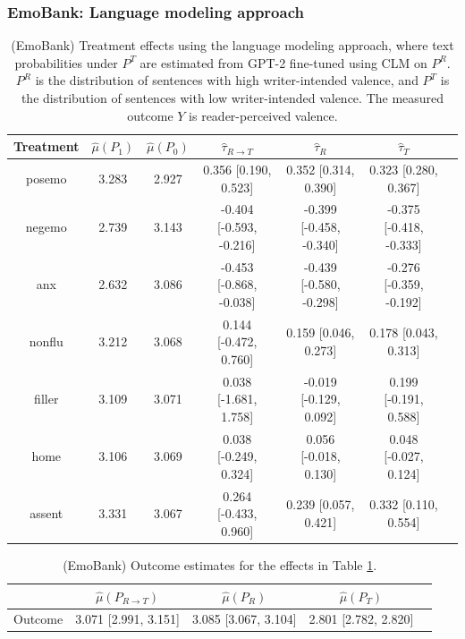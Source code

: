 \documentclass{article}
\begin{document}
\newpage
\subsubsection{EmoBank: Language modeling approach}

\begin{table}[!ht]
\centering
\begin{tabular}{c|cccccc}
\toprule
    Treatment   &   $\hat{\mu}(P_1)$ &   $\hat{\mu}(P_0)$ & $\hat{\tau}_{R \rightarrow T}$   & $\hat{\tau}_R$          & $\hat{\tau}_T$          \\
\midrule
    posemo      &              3.283 &              2.927 & 0.356 [0.190, 0.523]             & 0.352 [0.314, 0.390]    & 0.323 [0.280, 0.367]    \\
    negemo      &              2.739 &              3.143 & -0.404 [-0.593, -0.216]          & -0.399 [-0.458, -0.340] & -0.375 [-0.418, -0.333] \\
    anx         &              2.632 &              3.086 & -0.453 [-0.868, -0.038]          & -0.439 [-0.580, -0.298] & -0.276 [-0.359, -0.192] \\
    nonflu      &              3.212 &              3.068 & 0.144 [-0.472, 0.760]            & 0.159 [0.046, 0.273]    & 0.178 [0.043, 0.313]    \\
    filler      &              3.109 &              3.071 & 0.038 [-1.681, 1.758]            & -0.019 [-0.129, 0.092]  & 0.199 [-0.191, 0.588]   \\
    home        &              3.106 &              3.069 & 0.038 [-0.249, 0.324]            & 0.056 [-0.018, 0.130]   & 0.048 [-0.027, 0.124]   \\
    assent      &              3.331 &              3.067 & 0.264 [-0.433, 0.960]            & 0.239 [0.057, 0.421]    & 0.332 [0.110, 0.554]    \\
\bottomrule
\end{tabular}
\caption{(EmoBank) Treatment effects using the language modeling approach, where text probabilities under $P^T$ are estimated from GPT-2 fine-tuned using CLM on $P^R$. $P^R$ is the distribution of sentences with high writer-intended valence, and $P^T$ is the distribution of sentences with low writer-intended valence. The measured outcome $Y$ is reader-perceived valence.}
\label{tab:results_clm_gpt2_finetuned_emobank_pr}
\end{table}

\begin{table}[!ht]
\centering
\begin{tabular}{c|cccc}
\toprule
    & $\hat{\mu}(P_{R \rightarrow T})$   & $\hat{\mu}(P_R)$     & $\hat{\mu}(P_T)$     \\
\midrule
    Outcome & 3.071 [2.991, 3.151]               & 3.085 [3.067, 3.104] & 2.801 [2.782, 2.820] \\
\bottomrule
\end{tabular}
\caption{(EmoBank) Outcome estimates for the effects in Table \ref{tab:results_clm_gpt2_finetuned_emobank_pr}.}
\label{tab:results_clm_gpt2_finetuned_emobank_pr_outcome}
\end{table}
\end{document}
